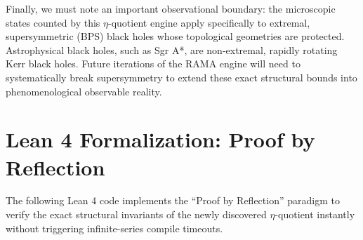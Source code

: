 \documentclass[12pt,a4paper]{article}
\begin{document}
Finally, we must note an important observational boundary: the microscopic states counted by this $\eta$-quotient engine apply specifically to extremal, supersymmetric (BPS) black holes whose topological geometries are protected. Astrophysical black holes, such as Sgr A*, are non-extremal, rapidly rotating Kerr black holes. Future iterations of the RAMA engine will need to systematically break supersymmetry to extend these exact structural bounds into phenomenological observable reality.

\newpage
\appendix
\section{Lean 4 Formalization: Proof by Reflection}
The following Lean 4 code implements the ``Proof by Reflection'' paradigm to verify the exact structural invariants of the newly discovered $\eta$-quotient instantly without triggering infinite-series compile timeouts.
\end{document}
